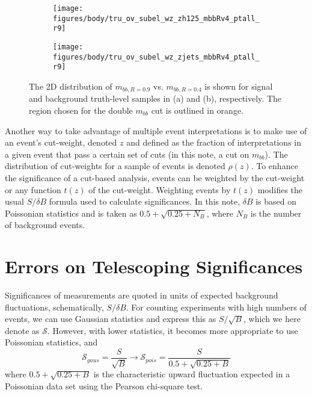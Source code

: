 \begin{figure}[!htbp]\captionsetup{justification=centering}
\begin{center}
\begin{subfigure}[t]{0.49\textwidth}\centering\texttt{[image: figures/body/tru\_ov\_subel\_wz\_zh125\_mbbRv4\_ptall\_r9]}\caption{}\end{subfigure}
\begin{subfigure}[t]{0.49\textwidth}\centering\texttt{[image: figures/body/tru\_ov\_subel\_wz\_zjets\_mbbRv4\_ptall\_r9]}\caption{}\end{subfigure}
\caption{\label{fig:2mwtru}The 2D distribution of $m_{bb,R=0.9}$ vs. $m_{bb,R=0.4}$ is shown for signal and background truth-level samples in (a) and (b), respectively.  The region chosen for the double $m_{bb}$ cut is outlined in orange.}
\end{center}
\end{figure}

Another way to take advantage of multiple event interpretations is to make use of an event's cut-weight, denoted $z$ and defined as the fraction of interpretations in a given event that pass a certain set of cuts (in this note, a cut on $m_{bb}$).  The distribution of cut-weights for a sample of events is denoted $\rho\left(z\right)$.  To enhance the significance of a cut-based analysis, events can be weighted by the cut-weight or any function $t\left(z\right)$ of the cut-weight.  Weighting events by $t\left(z\right)$ modifies the usual $S/\delta B$ formula used to calculate significances.  In this note, $\delta B$ is based on Poissonian statistics and is taken as $0.5+\sqrt{0.25+N_B}$, where $N_B$ is the number of background events.


\section{Errors on Telescoping Significances}
\label{sec:telerr}
Significances of measurements are quoted in units of expected background fluctuations, schematically, $S/\delta B$.  For counting experiments with high numbers of events, we can use Gaussian statistics and express this as $S/\sqrt{B}$, which we here denote as $\mathscr{S}$.  However, with lower statistics, it becomes more appropriate to use Poissonian statistics, and
\begin{equation}
\mathscr{S}_{gaus}=\frac{S}{\sqrt{B}}\to\mathscr{S}_{pois}=\frac{S}{0.5+\sqrt{0.25+B}}
\end{equation}
where $0.5+\sqrt{0.25+B}$ is the characteristic upward fluctuation expected in a Poissonian data set using the Pearson chi-square test\cite{roofit}.

